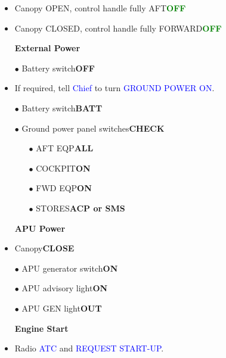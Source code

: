 \documentclass[a4paper,12pt,dvipsnames]{letter}
\newcommand{\radio}[1]{\textcolor{blue}{#1}}
\newcommand{\button}[1]{\textbf{#1}}
\newcommand{\ok}[1]{\textcolor{Green}{\textbf{#1}}}
\newcommand{\bi}{\textcolor{ProcessBlue}{$\bullet$\;}}
\begin{document}
{\begin{itemize}
\begin{itemize}
 \item Canopy OPEN, control handle fully AFT\dotfill\ok{OFF}
 \item Canopy CLOSED, control handle fully FORWARD\dotfill\ok{OFF}
\end{itemize}
\end{itemize}
\begin{itemize}
\item[] {\Large\textbf{External Power}}
\item[\bi] Battery switch\dotfill\button{OFF}
\item If required, tell \radio{Chief} to turn \radio{GROUND POWER ON}.
\item[\bi] Battery switch\dotfill\button{BATT}
\item[\bi] Ground power panel switches\dotfill\button{CHECK}
\begin{itemize}
 \item[\bi] AFT EQP\dotfill\button{ALL}
 \item[\bi] COCKPIT\dotfill\button{ON}
 \item[\bi] FWD EQP\dotfill\button{ON}
 \item[\bi] STORES\dotfill\button{ACP or SMS}
\end{itemize}
\end{itemize}
\begin{itemize}
\item[] {\Large\textbf{APU Power}}
\item Canopy\dotfill\button{CLOSE}
\item[\bi] APU generator switch\dotfill\button{ON}
\item[\bi] APU advisory light\dotfill\button{ON}
\item[\bi] APU GEN light\dotfill\button{OUT}
\end{itemize}
\newpage
\begin{itemize}
\item[] {\LARGE\textbf{Engine Start}}
\item Radio \radio{ATC} and \radio{REQUEST START-UP}.

\end{itemize}}
\end{document}
